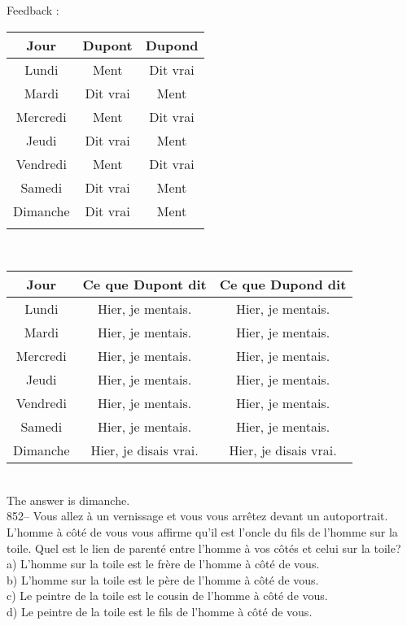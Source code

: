 ﻿\documentclass[letterpaper, 12pt]{article}
\begin{document}
Feedback : \\
\begin{tabular}{|c|c|c|} \hline
{\bf Jour} & {\bf Dupont} & {\bf Dupond} \\ \hline \hline

Lundi     & Ment  &  Dit vrai      \\ \hline
Mardi     & Dit vrai      &  Ment  \\ \hline
Mercredi  & Ment  &  Dit vrai      \\ \hline
Jeudi     & Dit vrai      &  Ment  \\ \hline
Vendredi  & Ment  &  Dit vrai      \\ \hline
Samedi    & Dit vrai      &  Ment  \\ \hline
Dimanche  & Dit vrai  &  Ment      \\ \hline
\multicolumn{3}{c}{}\\
\end{tabular}\\

\begin{tabular}{|c|c|c|} \hline
{\bf Jour} & {\bf Ce que Dupont dit } & {\bf Ce que Dupond dit } \\ \hline
\hline

Lundi     & Hier, je mentais.       &  Hier, je mentais.   \\ \hline
Mardi     & Hier, je mentais.      &  Hier, je mentais.       \\
\hline Mercredi  & Hier, je mentais.      &  Hier, je mentais.
\\ \hline Jeudi     & Hier, je mentais.      &  Hier, je mentais.
\\ \hline Vendredi  & Hier, je mentais.      &  Hier, je mentais.
\\ \hline Samedi    & Hier, je mentais.      &  Hier, je mentais.
\\ \hline Dimanche  & Hier, je disais vrai.  &  Hier, je disais
vrai.       \\ \hline
\end{tabular}\\

The answer is dimanche.  \\

852-- Vous allez \`a un vernissage et vous vous arr\^etez devant un
autoportrait.  L'homme \`a c\^ot\'e de vous vous affirme qu'il est l'oncle
du fils de l'homme sur la toile.  Quel est le lien de parent\'e entre
l'homme \`a vos c\^ot\'es et celui sur la toile?\\
a) L'homme sur la toile est le fr\`ere de l'homme \`a c\^ot\'e de vous.\\
b) L'homme sur la toile est le p\`ere de l'homme \`a c\^ot\'e de vous.\\
c) Le peintre de la toile est le cousin de l'homme \`a c\^ot\'e de vous.\\
d) Le peintre de la toile est le fils de l'homme \`a c\^ot\'e de vous.\\
\end{document}
